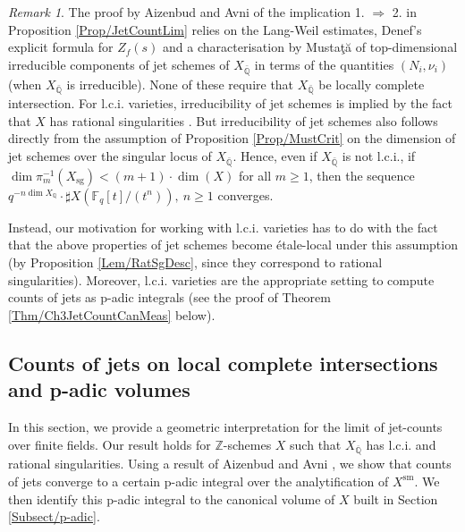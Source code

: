 \documentclass[11pt,english]{article}
\numberwithin{equation}{section}
\numberwithin{figure}{section}
\theoremstyle{definition}
\theoremstyle{plain}
\theoremstyle{remark}
\newtheorem{rmk}[df]{Remark}
\DeclareMathOperator{\sg}{sg}
\newcommand\ZZ{\mathbb{Z}}
\newcommand\QQ{\mathbb{Q}}
\begin{document}
\begin{rmk}

The proof by Aizenbud and Avni \cite[Thm. 3.0.3.]{AA18} of the implication
1. $\Rightarrow$ 2. in Proposition \ref{Prop/JetCountLim} relies
on the Lang-Weil estimates, Denef's explicit formula for $Z_{f}(s)$
and a characterisation by Musta\c{t}\u{a} of top-dimensional irreducible
components of jet schemes of $X_{\bar{\QQ}}$ in terms of the quantities
$(N_{i},\nu_{i})$ \cite[Thm. 3.2.]{Mus01} (when $X_{\bar{\QQ}}$
is irreducible). None of these require that $X_{\bar{\QQ}}$ be locally
complete intersection. For l.c.i. varieties, irreducibility of jet
schemes is implied by the fact that $X$ has rational singularities
\cite[Thm. 3.3.]{Mus01}. But irreducibility of jet schemes also follows
directly from the assumption of Proposition \ref{Prop/MustCrit} on
the dimension of jet schemes over the singular locus of $X_{\bar{\QQ}}$.
Hence, even if $X_{\bar{\QQ}}$ is not l.c.i., if $\dim\pi_{m}^{-1}(X_{\sg})<(m+1)\cdot\dim(X)$
for all $m\geq1$, then the sequence $q^{-n\dim X_{\mathbb{Q}}}\cdot\sharp X(\mathbb{F}_{q}[t]/(t^{n})),\ n\geq1$
converges.

Instead, our motivation for working with l.c.i. varieties has to do
with the fact that the above properties of jet schemes become étale-local
under this assumption (by Proposition \ref{Lem/RatSgDesc}, since
they correspond to rational singularities). Moreover, l.c.i. varieties
are the appropriate setting to compute counts of jets as p-adic integrals
(see the proof of Theorem \ref{Thm/Ch3JetCountCanMeas} below).

\end{rmk}

\subsection{Counts of jets on local complete intersections and p-adic volumes
\label{Subsect/JetCount=000026p-adicVol}}

In this section, we provide a geometric interpretation for the limit
of jet-counts over finite fields. Our result holds for $\ZZ$-schemes
$X$ such that $X_{\overline{\mathbb{Q}}}$ has l.c.i. and rational
singularities. Using a result of Aizenbud and Avni \cite{AA16}, we
show that counts of jets converge to a certain p-adic integral over
the analytification of $X^{\mathrm{sm}}$. We then identify this p-adic
integral to the canonical volume of $X$ built in Section \ref{Subsect/p-adic}.
\end{document}
